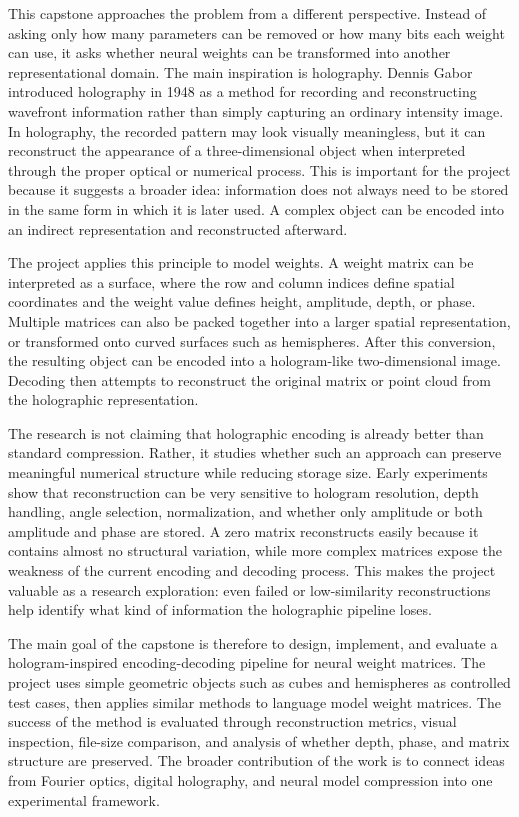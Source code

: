 \documentclass{article}
\begin{document}
\begin{normalsize}
        This capstone approaches the problem from a different perspective. Instead of asking only how many parameters can be removed or how many bits each weight can use, it asks whether neural weights can be transformed into another representational domain. The main inspiration is holography. Dennis Gabor introduced holography in 1948 as a method for recording and reconstructing wavefront information rather than simply capturing an ordinary intensity image. In holography, the recorded pattern may look visually meaningless, but it can reconstruct the appearance of a three-dimensional object when interpreted through the proper optical or numerical process. This is important for the project because it suggests a broader idea: information does not always need to be stored in the same form in which it is later used. A complex object can be encoded into an indirect representation and reconstructed afterward.

        The project applies this principle to model weights. A weight matrix can be interpreted as a surface, where the row and column indices define spatial coordinates and the weight value defines height, amplitude, depth, or phase. Multiple matrices can also be packed together into a larger spatial representation, or transformed onto curved surfaces such as hemispheres. After this conversion, the resulting object can be encoded into a hologram-like two-dimensional image. Decoding then attempts to reconstruct the original matrix or point cloud from the holographic representation.

        The research is not claiming that holographic encoding is already better than standard compression. Rather, it studies whether such an approach can preserve meaningful numerical structure while reducing storage size. Early experiments show that reconstruction can be very sensitive to hologram resolution, depth handling, angle selection, normalization, and whether only amplitude or both amplitude and phase are stored. A zero matrix reconstructs easily because it contains almost no structural variation, while more complex matrices expose the weakness of the current encoding and decoding process. This makes the project valuable as a research exploration: even failed or low-similarity reconstructions help identify what kind of information the holographic pipeline loses.

        The main goal of the capstone is therefore to design, implement, and evaluate a hologram-inspired encoding-decoding pipeline for neural weight matrices. The project uses simple geometric objects such as cubes and hemispheres as controlled test cases, then applies similar methods to language model weight matrices. The success of the method is evaluated through reconstruction metrics, visual inspection, file-size comparison, and analysis of whether depth, phase, and matrix structure are preserved. The broader contribution of the work is to connect ideas from Fourier optics, digital holography, and neural model compression into one experimental framework.


\end{normalsize}
\end{document}
